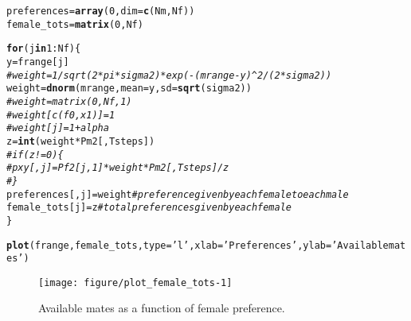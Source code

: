 \documentclass{article}\usepackage[]{graphicx}\usepackage[]{color}
\makeatletter
\def\maxwidth{ %
  \ifdim\Gin@nat@width>\linewidth
    \linewidth
  \else
    \Gin@nat@width
  \fi
}
\newcommand{\hlnum}[1]{\textcolor[rgb]{0.686,0.059,0.569}{#1}}%
\newcommand{\hlstr}[1]{\textcolor[rgb]{0.192,0.494,0.8}{#1}}%
\newcommand{\hlcom}[1]{\textcolor[rgb]{0.678,0.584,0.686}{\textit{#1}}}%
\newcommand{\hlopt}[1]{\textcolor[rgb]{0,0,0}{#1}}%
\newcommand{\hlstd}[1]{\textcolor[rgb]{0.345,0.345,0.345}{#1}}%
\newcommand{\hlkwa}[1]{\textcolor[rgb]{0.161,0.373,0.58}{\textbf{#1}}}%
\newcommand{\hlkwb}[1]{\textcolor[rgb]{0.69,0.353,0.396}{#1}}%
\newcommand{\hlkwc}[1]{\textcolor[rgb]{0.333,0.667,0.333}{#1}}%
\newcommand{\hlkwd}[1]{\textcolor[rgb]{0.737,0.353,0.396}{\textbf{#1}}}%
\newenvironment{kframe}{%
 \def\at@end@of@kframe{}%
 \ifinner\ifhmode%
  \def\at@end@of@kframe{\end{minipage}}%
  \begin{minipage}{\columnwidth}%
 \fi\fi%
 \def\FrameCommand##1{\hskip\@totalleftmargin \hskip-\fboxsep
 \colorbox{shadecolor}{##1}\hskip-\fboxsep
     \hskip-\linewidth \hskip-\@totalleftmargin \hskip\columnwidth}%
 \MakeFramed {\advance\hsize-\width
   \@totalleftmargin\z@ \linewidth\hsize
   \@setminipage}}%
 {\par\unskip\endMakeFramed%
 \at@end@of@kframe}
\newenvironment{knitrout}{}{} %
\makeatother
\begin{document}
\begin{knitrout}
\begin{kframe}
\begin{alltt}
\hlstd{preferences} \hlkwb{=} \hlkwd{array}\hlstd{(}\hlnum{0}\hlstd{,}\hlkwc{dim}\hlstd{=}\hlkwd{c}\hlstd{(Nm,Nf))}
\hlstd{female_tots} \hlkwb{=} \hlkwd{matrix}\hlstd{(}\hlnum{0}\hlstd{,Nf)}

\hlkwa{for}\hlstd{(j} \hlkwa{in} \hlnum{1}\hlopt{:}\hlstd{Nf)\{}
        \hlstd{y} \hlkwb{=} \hlstd{frange[j]}
        \hlcom{# weight = 1/sqrt(2*pi*sigma2)*exp(-(mrange-y)^2/(2*sigma2))}
        \hlstd{weight} \hlkwb{=} \hlkwd{dnorm}\hlstd{(mrange,}\hlkwc{mean}\hlstd{=y,}\hlkwc{sd}\hlstd{=}\hlkwd{sqrt}\hlstd{(sigma2))}
        \hlcom{# weight = matrix (0,Nf,1)}
        \hlcom{# weight[c(f0,x1)] = 1}
        \hlcom{# weight[j] = 1+alpha}
        \hlstd{z} \hlkwb{=} \hlkwd{int}\hlstd{(weight}\hlopt{*}\hlstd{Pm2[,Tsteps])}
        \hlcom{# if(z!=0)\{}
                \hlcom{# pxy[,j] = Pf2[j,1]*weight*Pm2[,Tsteps]/z}
                \hlcom{# \}}
        \hlstd{preferences[,j]} \hlkwb{=} \hlstd{weight} \hlcom{#preference given by each female to each male}
        \hlstd{female_tots[j]} \hlkwb{=} \hlstd{z} \hlcom{#total preferences given by each female}
\hlstd{\}}
\end{alltt}
\end{kframe}
\end{knitrout}

\begin{knitrout}
\color{fgcolor}\begin{kframe}
\begin{alltt}
\hlkwd{plot}\hlstd{(frange, female_tots,} \hlkwc{type}\hlstd{=}\hlstr{'l'}\hlstd{,} \hlkwc{xlab} \hlstd{=} \hlstr{'Preferences'}\hlstd{,}\hlkwc{ylab} \hlstd{=} \hlstr{'Available mates'}\hlstd{)}
\end{alltt}
\end{kframe}\begin{figure}
\texttt{[image: figure/plot\_female\_tots-1]} \caption[Available mates as a function of female preference]{Available mates as a function of female preference.}\label{fig:plot_female_tots}
\end{figure}


\end{knitrout}


\end{document}
